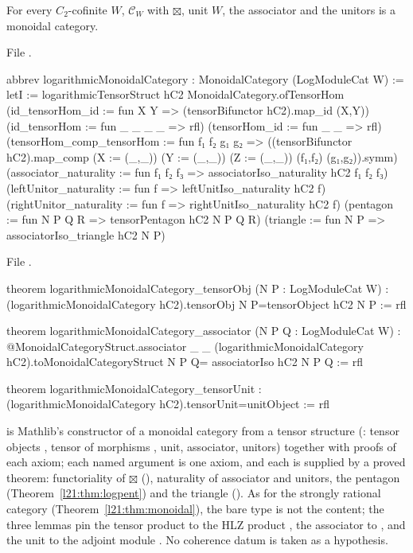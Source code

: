 \begin{theorem}\label{l21:thm:logmon}
For every $C_2$-cofinite $W$, $\mathcal C_W$ with $\boxtimes$, unit $W$, the associator  and the
unitors is a monoidal category.
\end{theorem}
\noindent File .
\begin{leancode}
abbrev logarithmicMonoidalCategory : MonoidalCategory (LogModuleCat W) :=
  letI := logarithmicTensorStruct hC2
  MonoidalCategory.ofTensorHom
    (id_tensorHom_id := fun X Y => (tensorBifunctor hC2).map_id (X,Y))
    (id_tensorHom := fun _ _ _ _ => rfl)
    (tensorHom_id := fun _ _ => rfl)
    (tensorHom_comp_tensorHom := fun f₁ f₂ g₁ g₂ =>
      ((tensorBifunctor hC2).map_comp (X := (_,_)) (Y := (_,_)) (Z := (_,_))
        (f₁,f₂) (g₁,g₂)).symm)
    (associator_naturality := fun f₁ f₂ f₃ => associatorIso_naturality hC2 f₁ f₂ f₃)
    (leftUnitor_naturality := fun f => leftUnitIso_naturality hC2 f)
    (rightUnitor_naturality := fun f => rightUnitIso_naturality hC2 f)
    (pentagon := fun N P Q R => tensorPentagon hC2 N P Q R)
    (triangle := fun N P => associatorIso_triangle hC2 N P)
\end{leancode}
\noindent File .
\begin{leancode}
theorem logarithmicMonoidalCategory_tensorObj (N P : LogModuleCat W) :
    (logarithmicMonoidalCategory hC2).tensorObj N P=tensorObject hC2 N P := rfl

theorem logarithmicMonoidalCategory_associator (N P Q : LogModuleCat W) :
    @MonoidalCategoryStruct.associator _ _
      (logarithmicMonoidalCategory hC2).toMonoidalCategoryStruct N P Q=
      associatorIso hC2 N P Q := rfl

theorem logarithmicMonoidalCategory_tensorUnit :
    (logarithmicMonoidalCategory hC2).tensorUnit=unitObject := rfl
\end{leancode}

\begin{dictionary}
 is Mathlib's constructor of a monoidal category from a tensor structure
(: tensor objects , tensor of morphisms ,
unit, associator, unitors) together with proofs of each axiom; each named argument is one axiom, and each is supplied
by a proved theorem: functoriality of $\boxtimes$ (), naturality of associator and unitors, the
pentagon (Theorem~\ref{l21:thm:logpent}) and the triangle (). As for the strongly
rational category (Theorem~\ref{l21:thm:monoidal}), the bare type  is not the
content; the three  lemmas pin the tensor product to the HLZ product , the associator to
, and the unit to the adjoint module . No coherence datum is taken as a hypothesis.
\end{dictionary}

